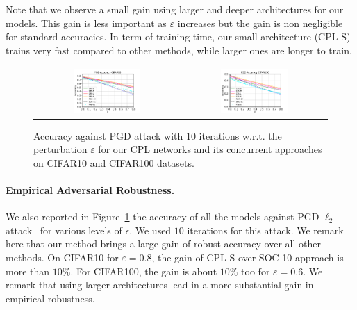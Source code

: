 Note that we observe a small gain using larger and deeper architectures for our models. This gain is less important as $\varepsilon$ increases but the gain is non negligible for standard accuracies. In term of training time, our small architecture (CPL-S) trains very fast compared to other methods, while larger ones are longer to train.


\begin{figure}[h]
    \centering
    \begin{tabular}{cc}
    \includegraphics[width =0.48\textwidth]{sections/4_certification/images/pgd_acc_eps_c10.pdf} & \includegraphics[width =0.48\textwidth]{sections/4_certification/images/pgd_acc_eps_c100.pdf}
    \end{tabular}
    \caption{Accuracy against PGD attack with 10 iterations w.r.t. the perturbation $\varepsilon$ for our CPL networks and its concurrent approaches on CIFAR10 and CIFAR100 datasets.}
    \label{fig:pgd-acc}
\end{figure}
\paragraph{Empirical Adversarial Robustness.} We also reported in Figure~\ref{fig:pgd-acc} the accuracy of all the models against PGD $\ell_2$-attack~\citep{kurakin2016adversarial,madry2018towards} for various levels of $\epsilon$. We used $10$ iterations for this attack. We remark here that our method brings a large gain of robust accuracy over all other methods. On CIFAR10 for $\varepsilon = 0.8$, the gain of CPL-S over SOC-10 approach is more than $10\%$. For CIFAR100, the gain is about $10\%$ too for $\varepsilon=0.6$. We remark that using larger architectures lead in a more substantial gain in empirical robustness. 

